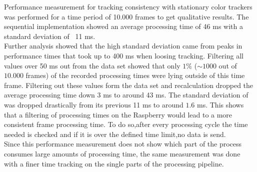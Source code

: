 Performance measurement for tracking consistency  with stationary color trackers was performed for a time period of 10.000 frames to get qualitative results. The sequential implementation showed an average processing time of 46 ms with a standard deviation of ~11 ms.\\
Further analysis showed that the high standard deviation came from peaks in performance times that took up to 400 ms when loosing tracking. Filtering all values over 50 ms out from the data set showed that only $1\%$ ($\sim 1000$ out of $10.000$ frames) of the recorded processing times were lying outside of this time frame. Filtering out these values form the data set and recalculation dropped the average processing time down 3 ms to around 43 ms. The standard deviation of was dropped drastically from its previous 11 ms to around $1.6$ ms. This shows that a filtering of processing times on the Raspberry would lead to a more consistent frame processing time. To do so,after every processing cycle the time needed is checked and if it is over the defined time limit,no data is send.\\
Since this performance measurement does not show which part of the process consumes large amounts of processing time, the same measurement was done with a finer time tracking on the single parts of the processing pipeline.
